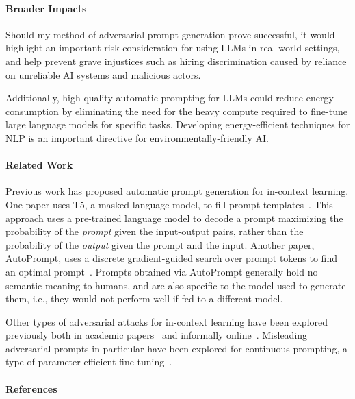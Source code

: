 \documentclass[11pt]{article}
\begin{document}
\paragraph{Broader Impacts}

Should my method of adversarial prompt generation prove successful, 
it would highlight an important risk consideration 
for using LLMs in real-world settings,
and help prevent grave injustices such as hiring discrimination 
caused by reliance on unreliable AI systems and malicious actors.

Additionally, high-quality automatic prompting for LLMs could 
reduce energy consumption by eliminating the need for the heavy compute 
required to fine-tune large language models for specific tasks.
Developing energy-efficient techniques for NLP is an important 
directive for environmentally-friendly AI.

\paragraph{Related Work}

Previous work has proposed automatic prompt generation
for in-context learning.
One paper uses T5, a masked language model, 
to fill prompt templates~\cite{Gao2021MakingPL}.
This approach uses a pre-trained language model to decode a prompt maximizing the probability of the \emph{prompt} given the input-output pairs, rather than the probability of the \emph{output} given the prompt and the input.
Another paper, AutoPrompt, 
uses a discrete gradient-guided search over prompt tokens 
to find an optimal prompt~\cite{Shin2020ElicitingKF}. 
Prompts obtained via AutoPrompt generally hold no semantic meaning to humans, 
and are also specific to the model used to generate them, 
i.e., they would not perform well if fed to a different model.

Other types of adversarial attacks for in-context learning have been explored previously both in academic papers~\cite{Wallace2019UniversalAT} and informally online~\cite{Willison2022PromptIA}.
Misleading adversarial prompts in particular 
have been explored for continuous prompting, 
a type of parameter-efficient fine-tuning~\cite{Khashabi2022PromptWT}.

\paragraph{References}



\clearpage


\end{document}
